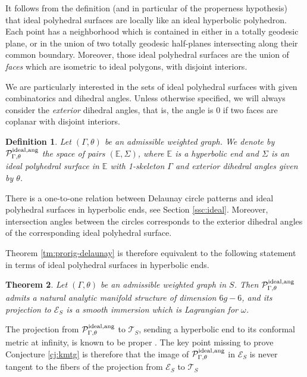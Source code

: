 \documentclass[notitlepage,twoside,a4paper]{amsart}
\newcommand{\Pidang}{\cP^{\rm ideal,ang}_{\Gamma,\theta}}
\newtheorem{theorem}{\rm\bf Theorem}[section]
\newtheorem{definition}[theorem]{\rm\bf Definition}
\theoremstyle{named}
\newcommand{\bE}{{\mathbb E}}
\newcommand{\cE}{{\mathcal E}}
\newcommand{\cP}{{\mathcal P}}
\newcommand{\cT}{{\mathcal T}}
\begin{document}
It follows from the definition (and in particular of the properness hypothesis) that ideal polyhedral surfaces are locally like an ideal hyperbolic polyhedron. Each point has a neighborhood which is contained in either in a totally geodesic plane, or in the union of two totally geodesic half-planes intersecting along their common boundary. Moreover, those ideal polyhedral surfaces are the union of {\em faces} which are isometric to ideal polygons, with disjoint interiors.

We are particularly interested in the sets of ideal polyhedral surfaces with given combinatorics and dihedral angles. Unless otherwise specified, we will always consider the {\em exterior} dihedral angles, that is, the angle is $0$ if two faces are coplanar with disjoint interiors.

\begin{definition}
  Let $(\Gamma,\theta)$ be an admissible weighted graph. We denote by $\Pidang$ the space of pairs $(\bE,\Sigma)$, where $\bE$ is a hyperbolic end and $\Sigma$ is an ideal polyhedral surface in $\bE$ with 1-skeleton  $\Gamma$ and exterior dihedral angles given by $\theta$.
\end{definition}

There is a one-to-one relation between Delaunay circle patterns and ideal polyhedral surfaces in hyperbolic ends, see Section \ref{ssc:ideal}. Moreover, intersection angles between the circles corresponds to the exterior dihedral angles of the corresponding ideal polyhedral surface.


Theorem \ref{tm:prorig-delaunay} is therefore equivalent to the following statement in terms of ideal polyhedral surfaces in hyperbolic ends.

\begin{theorem} \label{tm:ideal}
  Let $(\Gamma,\theta)$ be an admissible weighted graph in $S$. Then $\Pidang$ admits a natural analytic manifold structure of dimension $6g-6$, and its projection to $\cE_S$ is a smooth immersion which is Lagrangian for $\omega$.
\end{theorem}

The projection from $\Pidang$ to $\cT_S$, sending a hyperbolic end to its conformal metric at infinity, is known to be proper \cite{delaunay}. The key point missing to prove Conjecture \ref{cj:kmtg} is therefore that the image of $\Pidang$ in $\cE_S$ is never tangent to the fibers of the projection from $\cE_S$ to $\cT_S$
\end{document}
